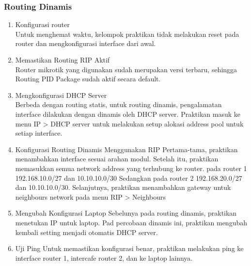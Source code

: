 \subsubsection{Routing Dinamis}
\begin{enumerate}
  \item Konfigurasi router\\
  Untuk menghemat waktu, kelompok praktikan tidak melakukan reset pada router dan mengkonfigurasi interface dari awal.
  \item Memastikan Routing RIP Aktif\\
  Router mikrotik yang digunakan sudah merupakan versi terbaru, sehingga Routing PID Package sudah aktif secara default.
  \item Mengkonfigurasi DHCP Server\\
  Berbeda dengan routing statis, untuk routing dinamis, pengalamatan interface dilakukan dengan dinamis oleh DHCP server. Praktikan masuk ke menu IP > DHCP server untuk melakukan setup alokasi address pool untuk setiap interface. 
  \item Konfigurasi Routing Dinamis Menggunakan RIP
  Pertama-tama, praktikan menambahkan interface sesuai arahan modul. Setelah itu, praktikan memasukkan semua network address yang terhubung ke router. pada router 1 192.168.10.0/27 dan 10.10.10.0/30 Sedangkan pada router 2 192.168.20.0/27 dan 10.10.10.0/30. Selanjutnya, praktikan menambahkan gateway untuk neighbours network pada menu RIP > Neighbours
  \item Mengubah Konfigurasi Laptop
  Sebelunya pada routing dinamis, praktikan menetukan IP untuk laptop. Pad percobaan dinamis ini, praktikan mengubah kembali setting menjadi otomatis DHCP server.
  \item Uji Ping
  Untuk memastikan konfigurasi benar, praktikan melakukan ping ke interface router 1, intercafe router 2, dan ke laptop lainnya.
\end{enumerate}

